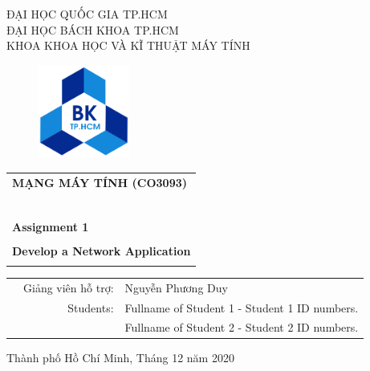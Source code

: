 \documentclass[a4paper]{article}
\begin{document}
	
	\begin{titlepage}
		\begin{center}
			ĐẠI HỌC QUỐC GIA TP.HCM \\
			ĐẠI HỌC BÁCH KHOA TP.HCM \\
			KHOA KHOA HỌC VÀ KĨ THUẬT MÁY TÍNH
		\end{center}
		
		\vspace{1cm}
		
		\begin{figure}[h!]
			\begin{center}
				\includegraphics[width=3cm]{images/hcmut.png}
			\end{center}
		\end{figure}
		
		\vspace{1cm}
		
		
		\begin{center}
			\begin{tabular}{c}
				\multicolumn{1}{l}{\textbf{{\Large MẠNG MÁY TÍNH (CO3093)}}}\\
				~~\\
				\hline
				\\
				\multicolumn{1}{l}{\textbf{{\Large Assignment 1}}}\\
				\\
				\textbf{{\Huge Develop a Network Application}}\\
				\\
				\hline
			\end{tabular}
		\end{center}
		
		\vspace{3cm}
		
		\begin{table}[h]
			\begin{tabular}{rrl}
				\hspace{5 cm} & Giảng viên hỗ trợ: & Nguyễn Phương Duy\\
				& Students: & Fullname of Student 1 - Student 1 ID numbers. \\
				& & Fullname of Student 2 - Student 2 ID numbers. \\
			\end{tabular}
		\end{table}
		
		\begin{center}
			{\footnotesize Thành phố Hồ Chí Minh, Tháng 12 năm 2020}
		\end{center}
	\end{titlepage}
	
\end{document}
